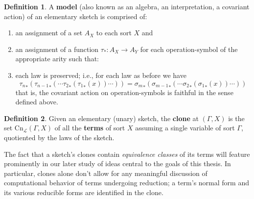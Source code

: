 \documentclass[12pt,twoside]{reedthesis}
\theoremstyle{definition}
\newtheorem{definition}{Definition}
\newtheorem{example}{Example}
\theoremstyle{remark}
\theoremstyle{plain}
\begin{document}
  \begin{definition}\label{def:model}
    A \textbf{model} (also known as an algebra, an interpretation, a covariant
    action) of an elementary sketch is comprised of:
    \begin{enumerate}
      \item an assignment of a set $A_X$ to each sort $X$ and
      \item an assignment of a function $\tau_* : A_X \rightarrow A_Y$ for each
            operation-symbol of the appropriate arity such that:
      \item each law is preserved; i.e., for each law as before we have
            \[ {\tau_n}_* ({\tau_{n-1}}_* (\cdots {\tau_2}_* ({\tau_1}_* (x))\cdots )) = {\sigma_m}_* ({\sigma_{m-1}}_*(\cdots {\sigma_2}_* ({\sigma_1}_* (x))\cdots )) \]
            that is, the covariant action on operation-symbols is faithful in
            the sense defined above.
    \end{enumerate}
  \end{definition}

  \begin{definition}\label{def:clone}
    Given an elementary (unary) sketch, the \textbf{clone} at \( (\Gamma, X) \) is
    the set \( \text{Cn}_\mathcal{L} (\Gamma, X) \) of all the \textbf{terms} of sort
    $X$ assuming a single variable of sort $\Gamma$, quotiented by the laws of the
    sketch.
  \end{definition}
  The fact that a sketch's clones contain \emph{equivalence classes} of its
  terms will feature prominently in our later study of ideas central to the
  goals of this thesis. In particular, clones alone don't allow for any
  meaningful discussion of computational behavior of terms undergoing reduction;
  a term's normal form and its various reducible forms are identified in the
  clone.
\end{document}
